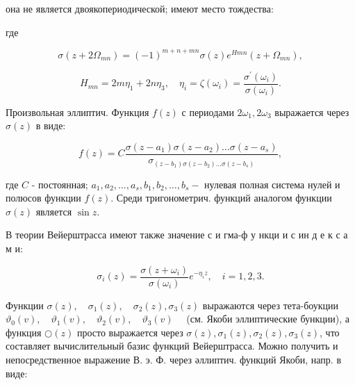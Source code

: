 \documentclass[10pt]{article}
\begin{document}
она не является двоякопериодической; имеют место тождества:



где



\[

\sigma\left(z+2 \Omega_{m n}\right)=(-1)^{m+n+m n} \sigma(z) e^{H m n}\left(z+\Omega_{m n}\right),

\]



\[

H_{m n}=2 m \eta_{1}+2 n \eta_{3}, \quad \eta_{i}=\zeta\left(\omega_{i}\right)=\frac{\sigma^{\prime}\left(\omega_{i}\right)}{\sigma\left(\omega_{i}\right)} .

\]



Произвольная эллиптич. Функция $f(z)$ с периодами $2 \omega_{1}, 2 \omega_{3}$ выражается через $\sigma(z)$ в виде:



\[

f(z)=C \frac{\sigma\left(z-a_{1}\right) \sigma\left(z-a_{2}\right) \ldots \sigma\left(z-a_{s}\right)}{\sigma_{\left(z-b_{1}\right) \sigma\left(z-b_{2}\right) \ldots \sigma\left(z-b_{s}\right)}},

\]



где $C$ - постоянная; $a_{1}, a_{2}, \ldots, a_{s}, b_{1}, b_{2}, \ldots, b_{s}-$ нулевая полная система нулей и полюсов функции $f(z)$. Среди тригонометрич. функций аналогом функции $\sigma(z)$ является $\sin z$.



В теории Вейерштрасса имеют также значение с и гма-ф у нкци и с ин д е к с а м и:



\[

\sigma_{i}(z)=\frac{\sigma\left(z+\omega_{i}\right)}{\sigma\left(\omega_{i}\right)} e^{-\eta_{i} z}, \quad i=1,2,3 .

\]



Функции $\sigma(z), \quad \sigma_{1}(z), \quad \sigma_{2}(z), \sigma_{3}(z)$ выражаются через тета-боукции $\vartheta_{0}(v), \quad \vartheta_{1}(v), \quad \vartheta_{2}(v), \quad \vartheta_{3}(v) \quad$ (см. Якоби эллиптические бункции), а функция $\bigcirc(z)$ просто выражается через $\sigma(z), \sigma_{1}(z), \sigma_{2}(z), \sigma_{3}(z)$, что составляет вычислительный базис функций Вейерштрасса. Можно получить и непосредственное выражение В. э. Ф. через әллиптич. функций Якоби, напр. в виде:
\end{document}
